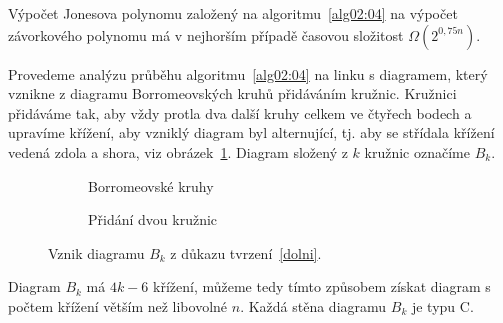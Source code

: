 \begin{tvrz} \label{dolni}
Výpočet Jonesova polynomu založený na algoritmu~\ref{alg02:04}  na výpočet závorkového polynomu má v nejhorším případě časovou složitost  $\Omega\left(2^{0,75 n}\right)$.
\end{tvrz}

\begin{dukaz}
Provedeme analýzu průběhu algoritmu~\ref{alg02:04} na linku s diagramem, který vznikne z diagramu Borromeovských kruhů přidáváním kružnic. Kružnici přidáváme tak, aby vždy protla dva další kruhy celkem ve čtyřech bodech a upravíme křížení, aby vzniklý diagram byl alternující, tj. aby se střídala křížení vedená zdola a shora, viz obrázek~\ref{borro}. Diagram složený z $k$ kružnic označíme $B_k$.

\begin{figure}[h]  

\centering 
\begin{subfigure}[t]{0.4\linewidth}\centering
{} 
\caption{Borromeovské kruhy} 
\end{subfigure}
\begin{subfigure}[t]{0.4\linewidth}\centering
{}
\caption{Přidání dvou kružnic}
\end{subfigure}
\caption{Vznik diagramu $B_k$ z důkazu tvrzení~\ref{dolni}.} \label{borro}
\end{figure}  


Diagram $B_k$ má $4k-6$ křížení, můžeme tedy tímto způsobem získat diagram s počtem křížení větším než libovolné $n$. Každá stěna diagramu $B_k$ je typu C.



\end{dukaz}
